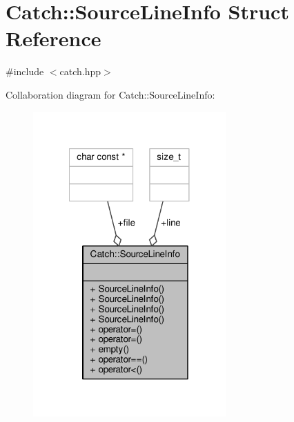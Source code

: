 \hypertarget{struct_catch_1_1_source_line_info}{\section{Catch\-:\-:Source\-Line\-Info Struct Reference}
\label{struct_catch_1_1_source_line_info}
}


{\ttfamily \#include $<$catch.\-hpp$>$}



Collaboration diagram for Catch\-:\-:Source\-Line\-Info\-:
\nopagebreak
\begin{figure}[H]
\begin{center}
\leavevmode
\includegraphics[width=209pt]{struct_catch_1_1_source_line_info__coll__graph}
\end{center}
\end{figure}
